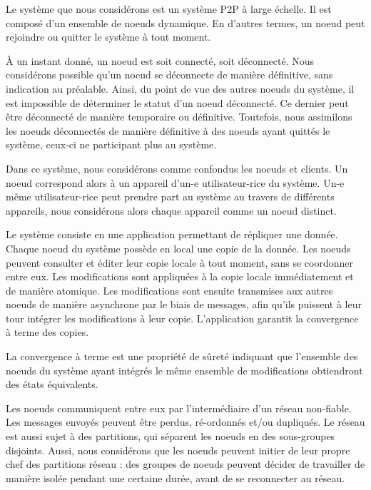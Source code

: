 \label{sec:system-model}

Le système que nous considérons est un système \acf{P2P} à large échelle.
Il est composé d'un ensemble de noeuds dynamique.
En d'autres termes, un noeud peut rejoindre ou quitter le système à tout moment.

À un instant donné, un noeud est soit connecté, soit déconnecté.
Nous considérons possible qu'un noeud se déconnecte de manière définitive, sans indication au préalable.
Ainsi, du point de vue des autres noeuds du système, il est impossible de déterminer le statut d'un noeud déconnecté.
Ce dernier peut être déconnecté de manière temporaire ou définitive.
Toutefois, nous assimilons les noeuds déconnectés de manière définitive à des noeuds ayant quittés le système, ceux-ci ne participant plus au système.

Dans ce système, nous considérons comme confondus les noeuds et clients.
Un noeud correspond alors à un appareil d'un-e utilisateur-rice du système.
Un-e même utilisateur-rice peut prendre part au système au travers de différents appareils, nous considérons alors chaque appareil comme un noeud distinct.

Le système consiste en une application permettant de répliquer une donnée.
Chaque noeud du système possède en local une copie de la donnée.
Les noeuds peuvent consulter et éditer leur copie locale à tout moment, sans se coordonner entre eux.
Les modifications sont appliquées à la copie locale immédiatement et de manière atomique.
Les modifications sont ensuite transmises aux autres noeuds de manière asynchrone par le biais de messages, afin qu'ils puissent à leur tour intégrer les modifications à leur copie.
L'application garantit la convergence à terme des copies.

\begin{definition}
    La convergence à terme est une propriété de sûreté indiquant que l'ensemble des noeuds du système ayant intégrés le même ensemble de modifications obtiendront des états équivalents\footnotemark.
\end{definition}

Les noeuds communiquent entre eux par l'intermédiaire d'un réseau non-fiable.
Les messages envoyés peuvent être perdus, ré-ordonnés et/ou dupliqués.
Le réseau est aussi sujet à des partitions, qui séparent les noeuds en des sous-groupes disjoints.
Aussi, nous considérons que les noeuds peuvent initier de leur propre chef des partitions réseau : des groupes de noeuds peuvent décider de travailler de manière isolée pendant une certaine durée, avant de se reconnecter au réseau.


